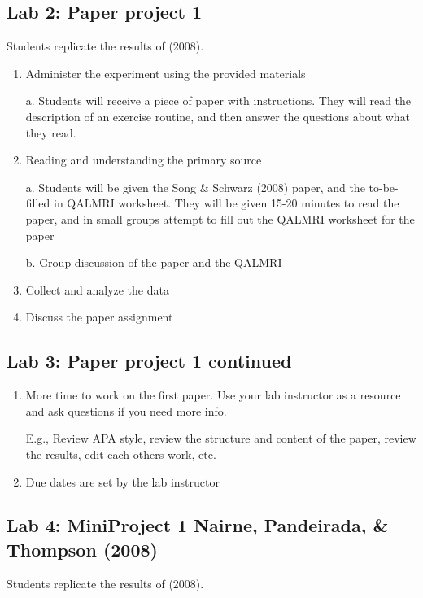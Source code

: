 \subsection{Lab 2: Paper project 1}

Students replicate the results of \citeauthor{song_if_2008} (2008)\cite{song_if_2008}.

\begin{enumerate}
\item Administer the experiment using the provided materials

a.	Students will receive a piece of paper with instructions. They will read the description of an exercise routine, and then answer the questions about what they read.
\item	Reading and understanding the primary source

a.	Students will be given the Song \& Schwarz (2008) paper, and the to-be-filled in QALMRI worksheet. They will be given 15-20 minutes to read the paper, and in small groups attempt to fill out the QALMRI worksheet for the paper

b.	Group discussion of the paper and the QALMRI
\item	Collect and analyze the data
\item	Discuss the paper assignment
\end{enumerate}

\subsection{Lab 3: Paper project 1 continued}
\begin{enumerate}
\item More time to work on the first paper. Use your lab instructor as a resource and ask questions if you need more info.

E.g., Review APA style, review the structure and content of the paper, review the results, edit each others work, etc.
\item Due dates are set by the lab instructor
\end{enumerate}

\subsection{Lab 4: MiniProject 1 Nairne, Pandeirada, \& Thompson (2008)}

Students replicate the results of \citeauthor{nairne_adaptive_2008} (2008)\cite{nairne_adaptive_2008}.

